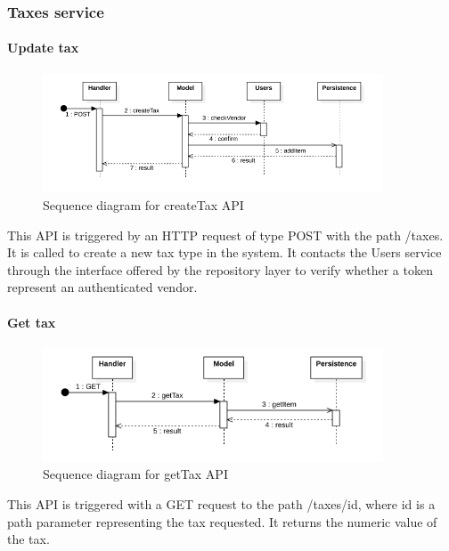 \subsubsection{Taxes service}
\paragraph*{Update tax}
\begin{figure}[H]
    \includegraphics[width=0.9\textwidth]{res/images/sequence-diagrams/taxes/createTax.png}
    \caption{Sequence diagram for createTax API}
\end{figure}
This API is triggered by an HTTP request of type POST with the path /taxes. It is called to create a new tax type in the system. It contacts the Users service through the interface offered by the repository layer to verify
whether a token represent an authenticated vendor.

\paragraph*{Get tax}
\begin{figure}[H]
    \includegraphics[width=0.9\textwidth]{res/images/sequence-diagrams/taxes/getTax.png}
    \caption{Sequence diagram for getTax API}
\end{figure}
This API is triggered with a GET request to the path /taxes/{id}, where id is a path parameter representing the tax requested. It returns the numeric value of the tax.

